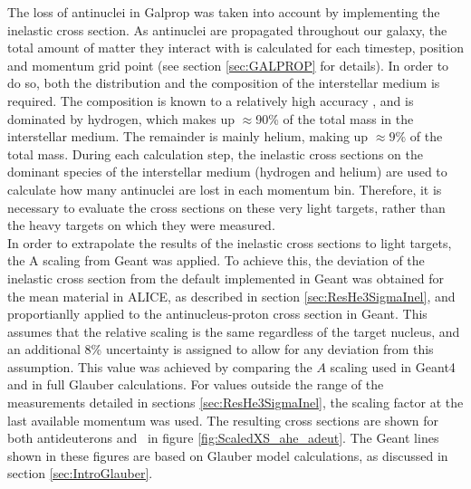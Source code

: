 The loss of antinuclei in Galprop was taken into account by implementing the inelastic cross section. As antinuclei are propagated throughout our galaxy, the total amount of matter they interact with is calculated for each timestep, position and momentum grid point (see section \ref{sec:GALPROP} for details). In order to do so, both the distribution and the composition of the interstellar medium is required. The composition is known to a relatively high accuracy \cite{}, and is dominated by hydrogen, which makes up $\approx$90\% of the total mass in the interstellar medium. The remainder is mainly helium, making up $\approx 9\%$ of the total mass. During each calculation step, the inelastic cross sections on the dominant species of the interstellar medium (hydrogen and helium) are used to calculate how many antinuclei are lost in each momentum bin. Therefore, it is necessary to evaluate the cross sections on these very light targets, rather than the heavy targets on which they were measured.\\

In order to extrapolate the results of the inelastic cross sections to light targets, the A scaling from Geant was applied. To achieve this, the deviation of the inelastic cross section from the default implemented in Geant was obtained for the mean material in ALICE, as described in section \ref{sec:ResHe3SigmaInel}, and proportianlly applied to the antinucleus-proton cross section in Geant. This assumes that the relative scaling is the same regardless of the target nucleus, and an additional 8\% uncertainty is assigned to allow for any deviation from this assumption. This value was achieved by comparing the $A$ scaling used in Geant4 and in full Glauber calculations\cite{antiHe3XS, glauber_model_geant4_scaling}. For values outside the range of the measurements detailed in sections \ref{sec:ResHe3SigmaInel}, the scaling factor at the last available momentum was used.
The resulting cross sections are shown for both antideuterons and \ahe\ in figure \ref{fig:ScaledXS_ahe_adeut}. The Geant lines shown in these figures are based on Glauber model calculations, as discussed in section \ref{sec:IntroGlauber}.

